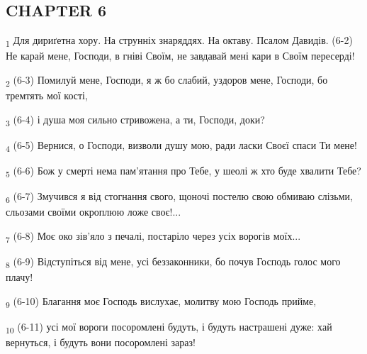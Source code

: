 \subsection{CHAPTER 6}
\begin{tcolorbox}
\textsubscript{1} Для дириґетна хору. На струнніх знаряддях. На октаву. Псалом Давидів. (6-2) Не карай мене, Господи, в гніві Своїм, не завдавай мені кари в Своїм пересерді!
\end{tcolorbox}
\begin{tcolorbox}
\textsubscript{2} (6-3) Помилуй мене, Господи, я ж бо слабий, уздоров мене, Господи, бо тремтять мої кості,
\end{tcolorbox}
\begin{tcolorbox}
\textsubscript{3} (6-4) і душа моя сильно стривожена, а ти, Господи, доки?
\end{tcolorbox}
\begin{tcolorbox}
\textsubscript{4} (6-5) Вернися, о Господи, визволи душу мою, ради ласки Своєї спаси Ти мене!
\end{tcolorbox}
\begin{tcolorbox}
\textsubscript{5} (6-6) Бож у смерті нема пам'ятання про Тебе, у шеолі ж хто буде хвалити Тебе?
\end{tcolorbox}
\begin{tcolorbox}
\textsubscript{6} (6-7) Змучився я від стогнання свого, щоночі постелю свою обмиваю слізьми, сльозами своїми окроплюю ложе своє!...
\end{tcolorbox}
\begin{tcolorbox}
\textsubscript{7} (6-8) Моє око зів'яло з печалі, постаріло через усіх ворогів моїх...
\end{tcolorbox}
\begin{tcolorbox}
\textsubscript{8} (6-9) Відступіться від мене, усі беззаконники, бо почув Господь голос мого плачу!
\end{tcolorbox}
\begin{tcolorbox}
\textsubscript{9} (6-10) Благання моє Господь вислухає, молитву мою Господь прийме,
\end{tcolorbox}
\begin{tcolorbox}
\textsubscript{10} (6-11) усі мої вороги посоромлені будуть, і будуть настрашені дуже: хай вернуться, і будуть вони посоромлені зараз!
\end{tcolorbox}
